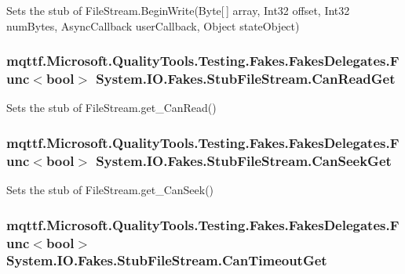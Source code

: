 Sets the stub of File\-Stream.\-Begin\-Write(\-Byte\mbox{[}$\,$\mbox{]} array, Int32 offset, Int32 num\-Bytes, Async\-Callback user\-Callback, Object state\-Object)

\hypertarget{class_system_1_1_i_o_1_1_fakes_1_1_stub_file_stream_af585e3ed673acb400090ea481ea15476}{
\subsubsection[{Can\-Read\-Get}]{\setlength{\rightskip}{0pt plus 5cm}mqttf.\-Microsoft.\-Quality\-Tools.\-Testing.\-Fakes.\-Fakes\-Delegates.\-Func$<$bool$>$ System.\-I\-O.\-Fakes.\-Stub\-File\-Stream.\-Can\-Read\-Get}}\label{class_system_1_1_i_o_1_1_fakes_1_1_stub_file_stream_af585e3ed673acb400090ea481ea15476}


Sets the stub of File\-Stream.\-get\-\_\-\-Can\-Read()

\hypertarget{class_system_1_1_i_o_1_1_fakes_1_1_stub_file_stream_aebeadf077e1935c15aea9d023419c407}{
\subsubsection[{Can\-Seek\-Get}]{\setlength{\rightskip}{0pt plus 5cm}mqttf.\-Microsoft.\-Quality\-Tools.\-Testing.\-Fakes.\-Fakes\-Delegates.\-Func$<$bool$>$ System.\-I\-O.\-Fakes.\-Stub\-File\-Stream.\-Can\-Seek\-Get}}\label{class_system_1_1_i_o_1_1_fakes_1_1_stub_file_stream_aebeadf077e1935c15aea9d023419c407}


Sets the stub of File\-Stream.\-get\-\_\-\-Can\-Seek()

\hypertarget{class_system_1_1_i_o_1_1_fakes_1_1_stub_file_stream_a826ec75c9565d9761a8cc049b0c961b9}{
\subsubsection[{Can\-Timeout\-Get}]{\setlength{\rightskip}{0pt plus 5cm}mqttf.\-Microsoft.\-Quality\-Tools.\-Testing.\-Fakes.\-Fakes\-Delegates.\-Func$<$bool$>$ System.\-I\-O.\-Fakes.\-Stub\-File\-Stream.\-Can\-Timeout\-Get}}\label{class_system_1_1_i_o_1_1_fakes_1_1_stub_file_stream_a826ec75c9565d9761a8cc049b0c961b9}


